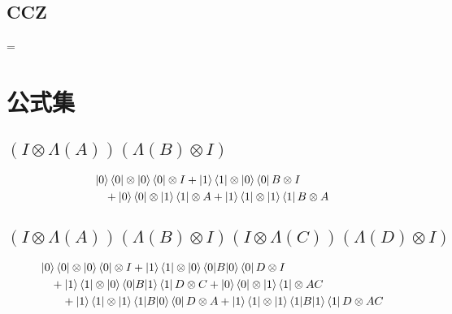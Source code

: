 \documentclass[b5paper,fleqn]{ltjsarticle}
\newcommand\al[1]{\begin{align*}#1\end{align*}}
\begin{document}
\subsection{CCZ}
\begin{minipage}{30pt}
\end{minipage}\quad=\quad
\begin{minipage}{30pt}
\end{minipage}
\newpage\section*{公式集}
\subsection{$(I\otimes\Lambda(A))(\Lambda(B)\otimes I)$}
\noindent\ignorespaces
\al{&\ket{0}\bra{0}\otimes\ket{0}\bra{0}\otimes I+\ket{1}\bra{1}\otimes\ket{0}\bra{0}B\otimes I\\
&\quad+\ket{0}\bra{0}\otimes\ket{1}\bra{1}\otimes A+\ket{1}\bra{1}\otimes\ket{1}\bra{1}B\otimes A
}
\subsection{$(I\otimes\Lambda(A))(\Lambda(B)\otimes I)(I\otimes\Lambda(C))(\Lambda(D)\otimes I)$}
\noindent\ignorespaces
\al{&\ket{0}\bra{0}\otimes\ket{0}\bra{0}\otimes I+\ket{1}\bra{1}\otimes\ket{0}\braket{0|B|0}\bra{0}D\otimes I\\
&\quad+\ket{1}\bra{1}\otimes\ket{0}\braket{0|B|1}\bra{1}D\otimes C+\ket{0}\bra{0}\otimes\ket{1}\bra{1}\otimes AC\\
&\qquad+\ket{1}\bra{1}\otimes\ket{1}\braket{1|B|0}\bra{0}D\otimes A
+\ket{1}\bra{1}\otimes\ket{1}\braket{1|B|1}\bra{1}D\otimes AC\\
}
\end{document}
